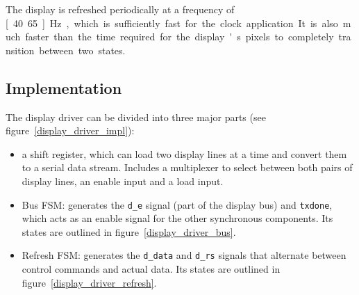 \documentclass[a4paper]{article}
\begin{document}
The display is refreshed periodically at a frequency of \unit[40.65]{Hz}, which
is sufficiently fast for the clock application. It is also much faster than the
time required for the display's pixels to completely transition between two
states.

\subsection{Implementation}

The display driver can be divided into three major parts (see figure~\ref{display_driver_impl}):

\begin{itemize}
	\item a shift register, which can load two display lines at a time and
	      convert them to a serial data stream. Includes a multiplexer to select
	      between both pairs of display lines, an enable input and a load input.
	\item Bus FSM: generates the \texttt{d\_e} signal (part of the display bus)
	      and \texttt{txdone}, which acts as an enable signal for the other
	      synchronous components. Its states are outlined in
	      figure~\ref{display_driver_bus}.
	\item Refresh FSM: generates the \texttt{d\_data} and \texttt{d\_rs} signals
	      that alternate between control commands and actual data. Its states
	      are outlined in figure~\ref{display_driver_refresh}.
\end{itemize}
\end{document}

